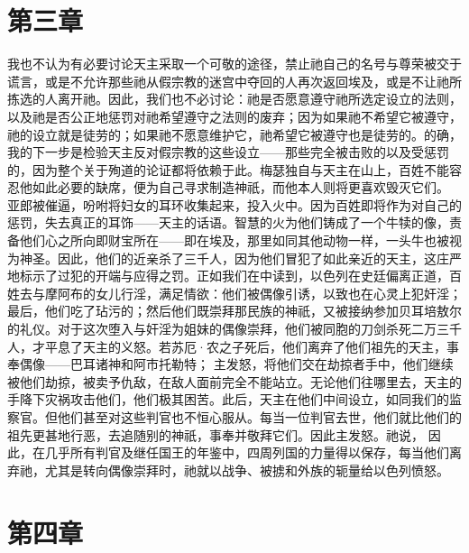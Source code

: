 \section{第三章}

我也不认为有必要讨论天主采取一个可敬的途径，禁止祂自己的名号与尊荣被交于谎言，或是不允许那些祂从假宗教的迷宫中夺回的人再次返回埃及，或是不让祂所拣选的人离开祂。因此，我们也不必讨论：祂是否愿意遵守祂所选定设立的法则，以及祂是否公正地惩罚对祂希望遵守之法则的废弃；因为如果祂不希望它被遵守，祂的设立就是徒劳的；如果祂不愿意维护它，祂希望它被遵守也是徒劳的。的确，我的下一步是检验天主反对假宗教的这些设立——那些完全被击败的以及受惩罚的，因为整个关于殉道的论证都将依赖于此。梅瑟独自与天主在山上，百姓不能容忍他如此必要的缺席，便为自己寻求制造神祇，而他本人则将更喜欢毁灭它们。 亚郎被催逼，吩咐将妇女的耳环收集起来，投入火中。因为百姓即将作为对自己的惩罚，失去真正的耳饰——天主的话语。智慧的火为他们铸成了一个牛犊的像，责备他们心之所向即财宝所在——即在埃及，那里如同其他动物一样，一头牛也被视为神圣。因此，他们的近亲杀了三千人，因为他们冒犯了如此亲近的天主，这庄严地标示了过犯的开端与应得之罚。正如我们在中读到，以色列在史廷偏离正道，百姓去与摩阿布的女儿行淫，满足情欲：他们被偶像引诱，以致也在心灵上犯奸淫；最后，他们吃了玷污的；然后他们既崇拜那民族的神祇，又被接纳参加贝耳培敖尔的礼仪。对于这次堕入与奸淫为姐妹的偶像崇拜，他们被同胞的刀剑杀死二万三千人，才平息了天主的义怒。若苏厄·农之子死后，他们离弃了他们祖先的天主，事奉偶像——巴耳诸神和阿市托勒特； 主发怒，将他们交在劫掠者手中，他们继续被他们劫掠，被卖予仇敌，在敌人面前完全不能站立。无论他们往哪里去，天主的手降下灾祸攻击他们，他们极其困苦。此后，天主在他们中间设立，如同我们的监察官。但他们甚至对这些判官也不恒心服从。每当一位判官去世，他们就比他们的祖先更甚地行恶，去追随别的神祇，事奉并敬拜它们。因此主发怒。祂说， 因此，在几乎所有判官及继任国王的年鉴中，四周列国的力量得以保存，每当他们离弃祂，尤其是转向偶像崇拜时，祂就以战争、被掳和外族的轭量给以色列愤怒。\par


\section{第四章}

